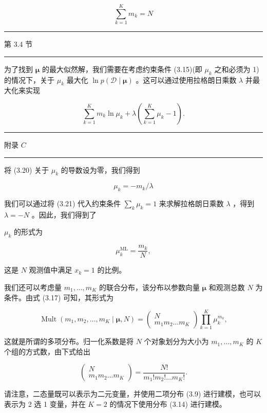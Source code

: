 \documentclass[10pt]{report}
\newcommand{\HRule}{\begin{center}\rule{0.9\linewidth}{0.2mm}\end{center}}
\begin{document}
\[
\mathop{\sum }\limits_{{k = 1}}^{K}{m}_{k} = N \tag{3.19}
\]

\HRule

第 3.4 节

\HRule

为了找到 \(\mathbf{\mu }\) 的最大似然解，我们需要在考虑约束条件 (3.15)(即 \({\mu }_{k}\) 之和必须为 1)的情况下，关于 \({\mu }_{k}\) 最大化 \(\ln p\left( {\mathcal{D} \mid  \mathbf{\mu }}\right)\) 。这可以通过使用拉格朗日乘数 \(\lambda\) 并最大化来实现

\[
\mathop{\sum }\limits_{{k = 1}}^{K}{m}_{k}\ln {\mu }_{k} + \lambda \left( {\mathop{\sum }\limits_{{k = 1}}^{K}{\mu }_{k} - 1}\right) . \tag{3.20}
\]

\HRule

附录 \(C\)

\HRule

将 (3.20) 关于 \({\mu }_{k}\) 的导数设为零，我们得到

\[
{\mu }_{k} =  - {m}_{k}/\lambda  \tag{3.21}
\]

我们可以通过将 (3.21) 代入约束条件 \(\mathop{\sum }\limits_{k}{\mu }_{k} = 1\) 来求解拉格朗日乘数 \(\lambda\) ，得到 \(\lambda  =  - N\) 。因此，我们得到了

\({\mu }_{k}\) 的形式为

\[
{\mu }_{k}^{\mathrm{{ML}}} = \frac{{m}_{k}}{N}, \tag{3.22}
\]

这是 \(N\) 观测值中满足 \({x}_{k} = 1\) 的比例。

我们还可以考虑量 \({m}_{1},\ldots ,{m}_{K}\) 的联合分布，该分布以参数向量 \(\mathbf{\mu }\) 和观测总数 \(N\) 为条件。由式 (3.17) 可知，其形式为

\[
\operatorname{Mult}\left( {{m}_{1},{m}_{2},\ldots ,{m}_{K} \mid  \mathbf{\mu },N}\right)  = \left( \begin{matrix} N \\  {m}_{1}{m}_{2}\ldots {m}_{K} \end{matrix}\right) \mathop{\prod }\limits_{{k = 1}}^{K}{\mu }_{k}^{{m}_{k}}, \tag{3.23}
\]

这就是所谓的多项分布。归一化系数是将 \(N\) 个对象划分为大小为 \({m}_{1},\ldots ,{m}_{K}\) 的 \(K\) 个组的方式数，由下式给出

\[
\left( \begin{matrix} N \\  {m}_{1}{m}_{2}\ldots {m}_{K} \end{matrix}\right)  = \frac{N!}{{m}_{1}!{m}_{2}!\ldots {m}_{K}!}. \tag{3.24}
\]

请注意，二态量既可以表示为二元变量，并使用二项分布 (3.9) 进行建模，也可以表示为 2 选 1 变量，并在 \(K = 2\) 的情况下使用分布 (3.14) 进行建模。
\end{document}
